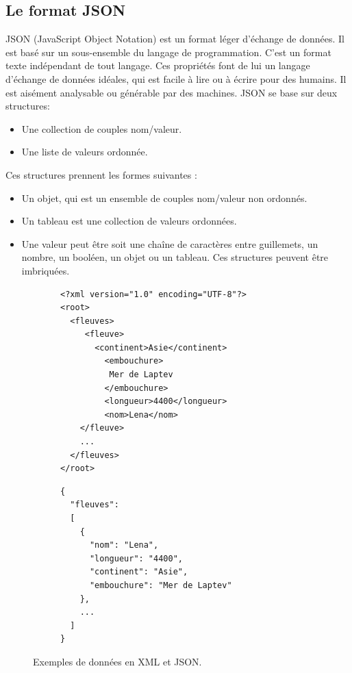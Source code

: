 \subsection{Le format JSON}
JSON (JavaScript Object Notation) est un format léger d'échange de données. Il est basé sur un sous-ensemble du langage de programmation. C’est un format texte indépendant de tout langage.
Ces propriétés font de lui un langage d'échange de données idéales, qui est facile à lire ou à écrire pour des humains. Il est aisément analysable ou générable par des machines. 
JSON se base sur deux structures:
\begin{itemize}
	
	\item Une collection de couples nom/valeur. 
	\item Une liste de valeurs ordonnée. 
\end{itemize}
Ces structures prennent les formes suivantes :
\begin{itemize}
	\item Un objet, qui est un ensemble de couples nom/valeur non ordonnés. 
	\item Un tableau est une collection de valeurs ordonnées. 
	\item Une valeur peut être soit une chaîne de caractères entre guillemets, un nombre, un booléen, un objet ou un tableau. Ces structures peuvent être imbriquées.
	      
\end{itemize}

\lstset{style=JSON}

\begin{figure}[h!]
  \centering
  \begin{subfigure}[b]{0.52\linewidth}
      \begin{lstlisting}[caption=Exemple en XML]
<?xml version="1.0" encoding="UTF-8"?>
<root>
  <fleuves>
     <fleuve>
       <continent>Asie</continent>
         <embouchure>
          Mer de Laptev
         </embouchure>
         <longueur>4400</longueur>
         <nom>Lena</nom>
    </fleuve>
    ...
  </fleuves>
</root>
\end{lstlisting}
  \end{subfigure}\hfill%
  \begin{subfigure}[b]{0.40\linewidth}
      \begin{lstlisting}[caption=Equivalent en JSON]
{
  "fleuves":
  [
    {
      "nom": "Lena",
      "longueur": "4400",
      "continent": "Asie",
      "embouchure": "Mer de Laptev"
    },
    ...
  ]
}       
\end{lstlisting}
\end{subfigure}\hfill%
\caption{Exemples de données en XML et JSON.}
\end{figure}


